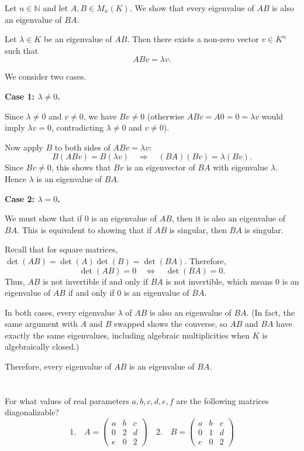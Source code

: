 \documentclass[12pt]{article}
\begin{document}
\begin{correctionbox}
Let $ n \in \mathbb{N} $ and let $ A, B \in M_n(K) $. We show that every eigenvalue of $ AB $ is also an eigenvalue of $ BA $.

Let $ \lambda \in K $ be an eigenvalue of $ AB $. Then there exists a non-zero vector $ v \in K^n $ such that
\[
ABv = \lambda v.
\]

We consider two cases.

\medskip

\noindent\textbf{Case 1: $ \lambda \neq 0 $.}

Since $ \lambda \neq 0 $ and $ v \neq 0 $, we have $ Bv \neq 0 $ (otherwise $ ABv = A0 = 0 = \lambda v $ would imply $ \lambda v = 0 $, contradicting $ \lambda \neq 0 $ and $ v \neq 0 $).

Now apply $ B $ to both sides of $ ABv = \lambda v $:
\[
B(ABv) = B(\lambda v) \quad \Longrightarrow \quad (BA)(Bv) = \lambda (Bv).
\]
Since $ Bv \neq 0 $, this shows that $ Bv $ is an eigenvector of $ BA $ with eigenvalue $ \lambda $. Hence $ \lambda $ is an eigenvalue of $ BA $.

\medskip

\noindent\textbf{Case 2: $ \lambda = 0 $.}

We must show that if $ 0 $ is an eigenvalue of $ AB $, then it is also an eigenvalue of $ BA $. This is equivalent to showing that if $ AB $ is singular, then $ BA $ is singular.

Recall that for square matrices, $ \det(AB) = \det(A)\det(B) = \det(BA) $. Therefore,
\[
\det(AB) = 0 \quad \Longleftrightarrow \quad \det(BA) = 0.
\]
Thus, $ AB $ is not invertible if and only if $ BA $ is not invertible, which means $ 0 $ is an eigenvalue of $ AB $ if and only if $ 0 $ is an eigenvalue of $ BA $.

\medskip

In both cases, every eigenvalue $ \lambda $ of $ AB $ is also an eigenvalue of $ BA $. (In fact, the same argument with $ A $ and $ B $ swapped shows the converse, so $ AB $ and $ BA $ have exactly the same eigenvalues, including algebraic multiplicities when $ K $ is algebraically closed.)

Therefore, every eigenvalue of $ AB $ is an eigenvalue of $ BA $.
\end{correctionbox}

\section{}
For what values of real parameters \( a,b,c,d,e,f \) are the following matrices diagonalizable?
\[
1.
\quad A = \begin{pmatrix}
a & b & c \\
0 & 2 & d \\
e & 0 & 2
\end{pmatrix}
\quad
2.
\quad B = \begin{pmatrix}
a & b & c \\
0 & 1 & d \\
e & 0 & 2
\end{pmatrix}
\]
\end{document}
